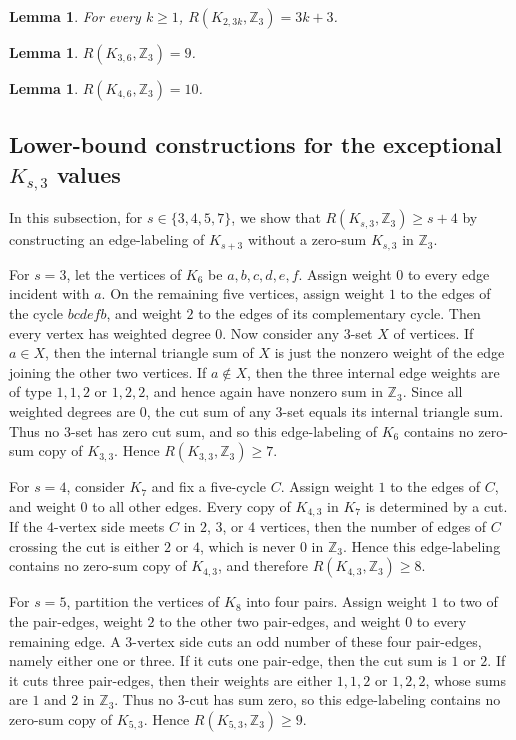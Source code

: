 ﻿\documentclass[11pt]{article}
\numberwithin{equation}{section}
\newtheorem{lemma}[theorem]{Lemma}
\theoremstyle{remark}
\newcommand{\Z}{\mathbb Z}
\begin{document}
\begin{lemma}\label{prop:two}
    For every $k\ge1$, $R(K_{2,3k},\Z_3)=3k+3$.
\end{lemma}

\begin{lemma}\label{prop:three-six}
    $R(K_{3,6},\Z_3)=9$.
\end{lemma}

\begin{lemma}\label{prop:four-six}
    $R(K_{4,6},\Z_3)=10$.
\end{lemma}


\subsection{Lower-bound constructions for the exceptional $K_{s,3}$ values}\label{subsec:small-lower}

In this subsection, for $s\in\{3,4,5,7\}$, we show that $R(K_{s,3},\Z_3)\ge s+4$ by constructing an edge-labeling of $K_{s+3}$ without a zero-sum $K_{s,3}$ in \(\Z_3\).

For $s=3$, let the vertices of $K_6$ be $a,b,c,d,e,f$.  Assign weight $0$ to every edge incident with $a$. On the remaining five vertices, assign weight $1$ to the edges of the cycle $bcdefb$, and weight $2$ to the edges of its complementary cycle.
Then every vertex has weighted degree $0$.
Now consider any \(3\)-set \(X\) of vertices. If \(a\in X\), then the internal triangle sum of \(X\) is just the nonzero weight of the edge joining the other two vertices. If \(a\notin X\), then the three internal edge weights are of type \(1,1,2\) or \(1,2,2\), and hence again have nonzero sum in \(\mathbb Z_3\). Since all weighted degrees are 0, the cut sum of any \(3\)-set equals its internal triangle sum. Thus no \(3\)-set has zero cut sum, and so this edge-labeling of \(K_6\) contains no zero-sum copy of \(K_{3,3}\). Hence $R(K_{3,3},\Z_3)\ge7.$

For $s=4$, consider $K_7$ and fix a five-cycle $C$.  Assign weight $1$ to the edges of $C$, and weight $0$ to all other edges.  Every copy of \(K_{4,3}\) in \(K_7\) is determined by a cut. If the $4$-vertex side meets $C$ in $2$, $3$, or $4$ vertices, then the number of edges of $C$ crossing the cut is either $2$ or $4$, which is never $0$ in $\Z_3$. Hence this edge-labeling contains no zero-sum copy of \(K_{4,3}\), and therefore $R(K_{4,3},\Z_3)\ge8$.

For $s=5$, partition the vertices of $K_8$ into four pairs.  Assign weight $1$ to two of the pair-edges, weight $2$ to the other two pair-edges, and weight $0$ to every remaining edge.  A $3$-vertex side cuts an odd number of these four pair-edges, namely either one or three.  If it cuts one pair-edge, then the cut sum is $1$ or $2$.  If it cuts three pair-edges, then their weights are either $1,1,2$ or $1,2,2$, whose sums are $1$ and $2$ in $\Z_3$. Thus no \(3\)-cut has sum zero, so this edge-labeling contains no zero-sum copy of \(K_{5,3}\). Hence $R(K_{5,3},\Z_3)\ge9$.
\end{document}
